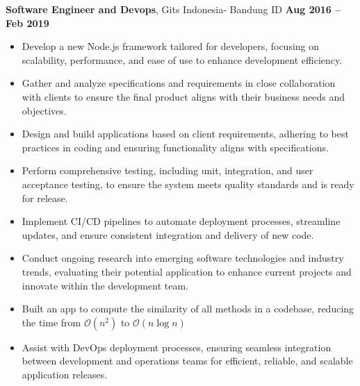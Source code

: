 \documentclass[10pt, letterpaper]{article}
\newenvironment{highlights}{
    \begin{itemize}[
        topsep=0.10 cm,
        parsep=0.10 cm,
        partopsep=0pt,
        itemsep=0pt,
        leftmargin=0 cm + 10pt
    ]
}{
    \end{itemize}
} %
\newenvironment{twocolentry}[2][]{
    \onecolentry
    \def\secondColumn{#2}
    \setcolumnwidth{\fill, 4.5 cm}
    \begin{paracol}{2}
}{
    \switchcolumn \raggedleft \secondColumn
    \end{paracol}
    \endonecolentry
} %
\begin{document}
        \begin{twocolentry}{
           \textbf{ Aug 2016 – Feb 2019}
        }
            \textbf{Software Engineer and Devops}, Gits Indonesia- Bandung ID\end{twocolentry}

        \vspace{0.10 cm}
        \begin{justify}
            \begin{highlights}
               	\item Develop a new Node.js framework tailored for developers, focusing on scalability, performance, and ease of use to enhance development efficiency.
               	
               	\item Gather and analyze specifications and requirements in close collaboration with clients to ensure the final product aligns with their business needs and objectives.
               	
               	\item Design and build applications based on client requirements, adhering to best practices in coding and ensuring functionality aligns with specifications.
               	
               	\item Perform comprehensive testing, including unit, integration, and user acceptance testing, to ensure the system meets quality standards and is ready for release.
               	
               	\item Implement CI/CD pipelines to automate deployment processes, streamline updates, and ensure consistent integration and delivery of new code.
               	
               	\item Conduct ongoing research into emerging software technologies and industry trends, evaluating their potential application to enhance current projects and innovate within the development team.
                \item Built an app to compute the similarity of all methods in a codebase, reducing the time from $\mathcal{O}(n^2)$ to $\mathcal{O}(n \log n)$
                \item Assist with DevOps deployment processes, ensuring seamless integration between development and operations teams for efficient, reliable, and scalable application releases.
               
            \end{highlights}
        \end{justify}
\end{document}
